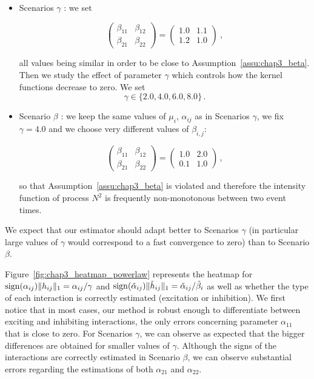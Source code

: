 \begin{itemize}
    \item  Scenarios $\gamma$ : we set
    
    \[\begin{pmatrix}
  \beta_{11} & \beta_{12}\\
  \beta_{21} & \beta_{22}
  \end{pmatrix}=
  \begin{pmatrix}
  1.0 & 1.1\\
  1.2 & 1.0
  \end{pmatrix}\ ,
\]
    
all values being similar in order to be close to Assumption~\ref{assu:chap3_beta}. Then we study the effect of parameter $\gamma$ which controls how the kernel functions decrease to zero. We set \[\gamma\in\{2.0, 4.0, 6.0, 8.0\}\,.\]


    \item Scenario $\beta$ : we keep the same values of $\mu_i$, $\alpha_{ij}$ as in Scenarios $\gamma$, we fix $\gamma=4.0$ and we choose very different values of $\beta_{i,j}$:
    
    
 \[\begin{pmatrix}
  \beta_{11} & \beta_{12}\\
  \beta_{21} & \beta_{22}
  \end{pmatrix}=
  \begin{pmatrix}
  1.0 & 2.0\\
  0.1 & 1.0
  \end{pmatrix}\,,
\]
    
    
    
    so that Assumption~\ref{assu:chap3_beta} is violated and therefore the intensity function of process $N^2$ is frequently non-monotonous between two event times.

\end{itemize}

We expect that our estimator should adapt better to Scenarios $\gamma$ (in particular large values of $\gamma$ would correspond to a fast convergence to zero) than to Scenario $\beta$.

Figure~\ref{fig:chap3_heatmap_powerlaw} represents the heatmap for $\operatorname{sign}(\alpha_{ij})\| h_{ij} \|_1 = \alpha_{ij}/\gamma$ and $\operatorname{sign}(\tilde \alpha_{ij})\| \tilde h_{ij}\|_1 = \tilde \alpha_{ij}/ \tilde\beta_{i}$ as well as whether the type of each interaction is correctly estimated (excitation or inhibition). We first notice that in most cases, our method is robust enough to differentiate between exciting and inhibiting interactions, the only errors concerning parameter $\alpha_{11}$ that is close to zero. For Scenarios $\gamma$, we can observe as expected that the bigger differences are obtained for smaller values of $\gamma$. Although the signs of the interactions are correctly estimated in Scenario $\beta$, we can observe substantial errors regarding the estimations of both $\alpha_{21}$ and $\alpha_{22}$. 

